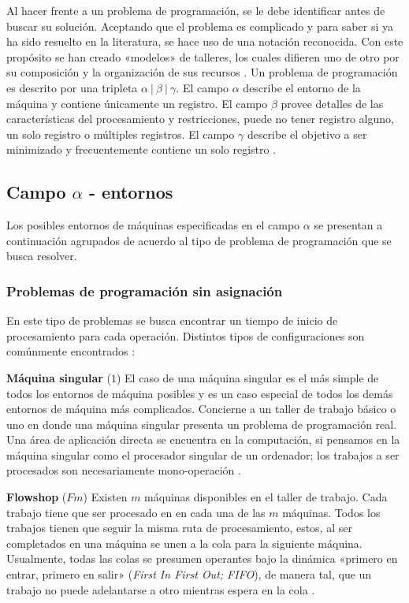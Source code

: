 \documentclass[spanish,draft,12pt,headsepline,footsepline,paper=letter]{scrreprt}
\begin{document}
Al hacer frente a un problema de programación, se le debe identificar antes de buscar su solución. Aceptando que el problema es complicado y para saber si ya ha sido resuelto en la literatura, se hace uso de una notación reconocida. Con este propósito se han creado «modelos» de talleres, los cuales difieren uno de otro por su composición y la organización de sus recursos \citep[p.~7]{TKindt2002}. Un problema de programación es descrito por una tripleta $\alpha\: \lvert \: \beta\: \lvert \: \gamma$. El campo $\alpha$ describe el entorno de la máquina y contiene únicamente un registro. El campo $\beta$ provee detalles de las características del procesamiento y restricciones, puede no tener registro alguno, un solo registro o múltiples registros. El campo $\gamma$ describe el objetivo a ser minimizado y frecuentemente contiene un solo registro \citep[p.~14]{Pinedo1995}.

\subsection{Campo $\alpha$ - entornos}

Los posibles entornos de máquinas especificadas en el campo $\alpha$ se presentan a continuación agrupados de acuerdo al tipo de problema de programación que se busca resolver.

\subsubsection{Problemas de programación sin asignación}

En este tipo de problemas se busca encontrar un tiempo de inicio de procesamiento para cada operación. Distintos tipos de configuraciones son comúnmente encontrados \citep[p.~8]{TKindt2002}:

\textbf{Máquina singular} ($1$) El caso de una máquina singular es el más simple de todos los entornos de máquina posibles y es un caso especial de todos los demás entornos de máquina más complicados. Concierne a un taller de trabajo básico o uno en donde una máquina singular presenta un problema de programación real. Una área de aplicación directa se encuentra en la computación, si pensamos en la máquina singular como el procesador singular de un ordenador; los trabajos a ser procesados son necesariamente mono-operación \citep[p.~8, p.~14]{TKindt2002,Pinedo1995}.

\textbf{Flowshop} ($Fm$) Existen $m$ máquinas disponibles en el taller de trabajo. Cada trabajo tiene que ser procesado en en cada una de las $m$ máquinas. Todos los trabajos tienen que seguir la misma ruta de procesamiento, estos, al ser completados en una máquina se unen a la cola para la siguiente máquina. Usualmente, todas las colas se presumen operantes bajo la dinámica  «primero en entrar, primero en salir» (\textit{First In First Out; FIFO}), de manera tal, que un trabajo no puede adelantarse a otro mientras espera en la cola \citep[p.~8, p.~15]{TKindt2002,Pinedo1995}.
\end{document}
